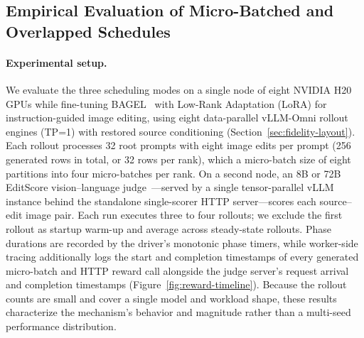 \subsection{Empirical Evaluation of Micro-Batched and Overlapped Schedules}
\label{sec:reward-results}

\paragraph{Experimental setup.}
We evaluate the three scheduling modes on a single node of eight NVIDIA H20 GPUs while fine-tuning BAGEL~\citep{deng2025bagel} with Low-Rank Adaptation (LoRA) for instruction-guided image editing, using eight data-parallel vLLM-Omni rollout engines (TP=1) with restored source conditioning (Section~\ref{sec:fidelity-layout}).
Each rollout processes 32 root prompts with eight image edits per prompt (256 generated rows in total, or 32 rows per rank), which a micro-batch size of eight partitions into four micro-batches per rank.
On a second node, an 8B or 72B EditScore vision--language judge~\citep{luo2025editscore}---served by a single tensor-parallel vLLM instance behind the standalone single-scorer HTTP server---scores each source--edit image pair.
Each run executes three to four rollouts; we exclude the first rollout as startup warm-up and average across steady-state rollouts.
Phase durations are recorded by the driver's monotonic phase timers, while worker-side tracing additionally logs the start and completion timestamps of every generated micro-batch and HTTP reward call alongside the judge server's request arrival and completion timestamps (Figure~\ref{fig:reward-timeline}).
Because the rollout counts are small and cover a single model and workload shape, these results characterize the mechanism's behavior and magnitude rather than a multi-seed performance distribution.

\begin{table}[H]
\caption{Generation plus reward wall-clock time per rollout across three scheduling modes (mean and min--max range over steady-state rollouts). The upper two blocks pair BAGEL image editing with a remote EditScore judge; the bottom block pairs BAGEL text-to-image generation with an in-process PickScore backend.}
\label{tab:reward-overlap}
\centering
\small

\end{table}

